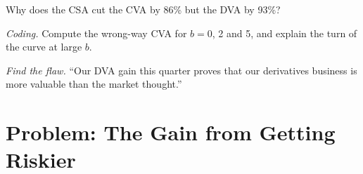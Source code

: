 \begin{exercise}[$\star\star$]\label{exo:rc:credit-and-debit-valuation-adjustments:6}
Why does the CSA cut the CVA by 86\% but the DVA by 93\%?
\end{exercise}

\begin{exercise}[$\star\star\star$]\label{exo:rc:credit-and-debit-valuation-adjustments:7}
\emph{Coding.} Compute the wrong-way CVA for $b = 0$, 2 and 5, and explain the turn of
the curve at large $b$.
\end{exercise}

\begin{exercise}[$\star\star\star$]\label{exo:rc:credit-and-debit-valuation-adjustments:8}
\emph{Find the flaw.} ``Our DVA gain this quarter proves that our derivatives business is
more valuable than the market thought.''
\end{exercise}

\section{Problem: The Gain from Getting Riskier}

